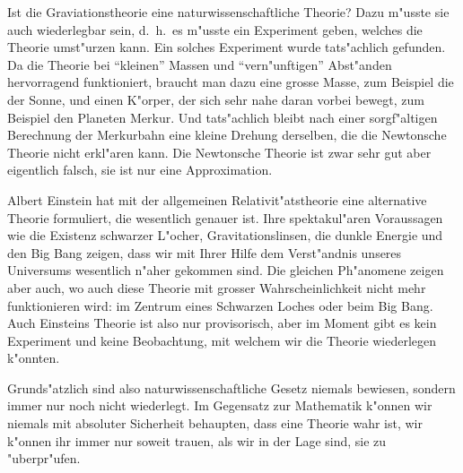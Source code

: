 Ist die Graviationstheorie eine naturwissenschaftliche Theorie?
Dazu m"usste sie auch wiederlegbar sein, d.~h.~es m"usste ein
Experiment geben, welches die Theorie umst"urzen kann.
Ein solches Experiment wurde tats"achlich gefunden. Da die Theorie
bei ``kleinen'' Massen und ``vern"unftigen'' Abst"anden hervorragend
funktioniert, braucht man dazu eine grosse Masse, zum Beispiel
die der Sonne, und einen K"orper, der sich sehr nahe daran
vorbei bewegt, zum Beispiel den Planeten Merkur.
Und tats"achlich bleibt nach einer sorgf"altigen Berechnung 
der Merkurbahn eine kleine Drehung derselben, die die
Newtonsche Theorie nicht erkl"aren kann.
Die Newtonsche Theorie ist zwar sehr gut aber eigentlich falsch,
sie ist nur eine Approximation.

Albert Einstein hat mit der allgemeinen Relativit"atstheorie eine
alternative Theorie formuliert, die wesentlich genauer ist.
Ihre spektakul"aren Voraussagen wie die Existenz schwarzer L"ocher,
Gravitationslinsen, die dunkle Energie und den Big Bang zeigen,
dass wir mit Ihrer Hilfe dem Verst"andnis unseres Universums 
wesentlich n"aher gekommen sind. Die gleichen Ph"anomene zeigen
aber auch, wo auch diese Theorie mit grosser Wahrscheinlichkeit
nicht mehr funktionieren wird: im Zentrum eines Schwarzen Loches oder
beim Big Bang.
Auch Einsteins Theorie ist also nur provisorisch, aber im Moment
gibt es kein Experiment und keine Beobachtung, mit welchem wir die
Theorie wiederlegen k"onnten.

Grunds"atzlich sind also naturwissenschaftliche Gesetz niemals
bewiesen, sondern immer nur noch nicht wiederlegt.
Im Gegensatz zur Mathematik k"onnen wir niemals mit
absoluter Sicherheit behaupten, dass eine Theorie wahr ist,
wir k"onnen ihr immer nur soweit trauen, als wir in der Lage sind,
sie zu "uberpr"ufen.

